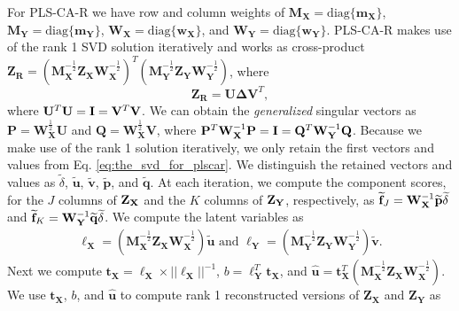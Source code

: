 \documentclass[12pt]{article}
\begin{document}
For PLS-CA-R we have row and column weights of
\({\mathbf M}_{\mathbf X} = \mathrm{diag\{}{\mathbf m}_{\mathbf X} \mathrm{\}}\),
\({\mathbf M}_{\mathbf Y} = \mathrm{diag\{}{\mathbf m}_{\mathbf Y} \mathrm{\}}\),
\({\mathbf W}_{\mathbf X} = \mathrm{diag\{}{\mathbf w}_{\mathbf X} \mathrm{\}}\),
and
\({\mathbf W}_{\mathbf Y} = \mathrm{diag\{}{\mathbf w}_{\mathbf Y} \mathrm{\}}\).
PLS-CA-R makes use of the rank 1 SVD solution iteratively and works as
cross-product
\({\mathbf Z}_{\mathbf R} = ({\mathbf M}_{\mathbf X}^{-\frac{1}{2}}{\mathbf Z}_{\mathbf X}{\mathbf W}_{\mathbf X}^{-\frac{1}{2}})^{T}({\mathbf M}_{\mathbf Y}^{-\frac{1}{2}}{\mathbf Z}_{\mathbf Y}{\mathbf W}_{\mathbf Y}^{-\frac{1}{2}})\),
where \begin{equation}
{\mathbf Z}_{\mathbf R} = {\mathbf U} {\boldsymbol \Delta} {\mathbf V}^{T},
\label{eq:the_svd_for_plscar}
\end{equation} where
\({\bf U}^{T}{\bf U} = {\bf I} = {\bf V}^{T}{\bf V}\). We can obtain the
\emph{generalized} singular vectors as
\({\mathbf P} = {\mathbf W}_{{\mathbf X}}^{\frac{1}{2}}{\mathbf U}\) and
\({\mathbf Q} = {\mathbf W}_{{\mathbf X}}^{\frac{1}{2}}{\mathbf V}\),
where
\({\bf P}^{T}{\bf W}_{\bf X}^{-1}{\bf P} = {\bf I} = {\bf Q}^{T}{\bf W}_{\bf Y}^{-1}{\bf Q}\).
Because we make use of the rank 1 solution iteratively, we only retain
the first vectors and values from Eq. \ref{eq:the_svd_for_plscar}. We
distinguish the retained vectors and values as \(\tilde\delta\),
\(\widetilde{\mathbf u}\), \(\widetilde{\mathbf v}\),
\(\widetilde{\mathbf p}\), and \(\widetilde{\mathbf q}\). At each
iteration, we compute the component scores, for the \(J\) columns of
\({\bf Z}_{\bf X}\) and the \(K\) columns of \({\bf Z}_{\bf Y}\),
respectively, as
\(\widetilde{\mathbf f}_{J} = {\bf W}_{\bf X}^{-1}\widetilde{\mathbf p}{\widetilde\delta}\)
and
\(\widetilde{\mathbf f}_{K} = {\bf W}_{\bf Y}^{-1}\widetilde{\mathbf q}{\widetilde\delta}\).
We compute the latent variables as \begin{equation}
\begin{aligned}
{\boldsymbol \ell}_{\mathbf X} = ({\mathbf M}_{\mathbf X}^{-\frac{1}{2}}{\mathbf Z}_{\mathbf X}{\mathbf W}_{\mathbf X}^{-\frac{1}{2}})\widetilde{\mathbf u} \text{ and } {\boldsymbol \ell}_{\mathbf Y} = ({\mathbf M}_{\mathbf Y}^{-\frac{1}{2}}{\mathbf Z}_{\mathbf Y}{\mathbf W}_{\mathbf Y}^{-\frac{1}{2}})\widetilde{\mathbf v}.
\label{eq:lvs}
\end{aligned}
\end{equation} Next we compute
\({\mathbf t}_{\mathbf X} = {\boldsymbol \ell}_{\mathbf X} \times {{\lvert\lvert {\boldsymbol \ell}_{\mathbf X} \rvert\rvert}^{-1}}\),
\(b = {\boldsymbol \ell}_{\mathbf Y}^{T}{\mathbf t}_{\mathbf X}\), and
\(\widehat{\mathbf u} = {\mathbf t}_{\mathbf X}^{T} ({\mathbf M}_{\mathbf X}^{-\frac{1}{2}}{\mathbf Z}_{\mathbf X}{\mathbf W}_{\mathbf X}^{-\frac{1}{2}})\).
We use \({\mathbf t}_{\mathbf X}\), \(b\), and \(\widehat{\mathbf u}\)
to compute rank 1 reconstructed versions of \({\mathbf Z}_{\mathbf X}\)
and \({\mathbf Z}_{\mathbf Y}\) as
\end{document}
